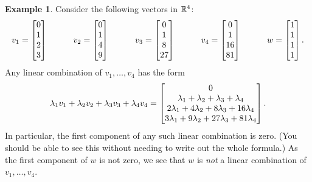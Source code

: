 \documentclass[reqno]{amsart}
\theoremstyle{definition}
\newtheorem{example}[theorem]{Example}
\begin{document}
\begin{example}\label{eg-lincomb-ii}
 Consider the following vectors in ${\mathbb{R}}^4$:
 \[ v_1 = \left[\begin{matrix} 0 \\ 1 \\  2 \\  3 \end{matrix}\right] \hspace{3em}
    v_2 = \left[\begin{matrix} 0 \\ 1 \\  4 \\  9 \end{matrix}\right] \hspace{3em}
    v_3 = \left[\begin{matrix} 0 \\ 1 \\  8 \\ 27 \end{matrix}\right] \hspace{3em}
    v_4 = \left[\begin{matrix} 0 \\ 1 \\ 16 \\ 81 \end{matrix}\right] \hspace{3em}
    w = \left[\begin{matrix} 1 \\ 1 \\ 1 \\ 1 \end{matrix}\right].
 \]
 Any linear combination of $v_1,\dotsc,v_4$ has the form
 \[ \lambda_1v_1 + \lambda_2v_2 + \lambda_3v_3 + \lambda_4v_4 =
     \left[\begin{matrix} 0 \\ \lambda_1+\lambda_2+\lambda_3+\lambda_4 \\
          2\lambda_1+4\lambda_2+8\lambda_3+16\lambda_4 \\
          3\lambda_1+9\lambda_2+27\lambda_3+81\lambda_4 \end{matrix}\right].
 \]
 In particular, the first component of any such linear combination is
 zero.  (You should be able to see this without needing to write out
 the whole formula.)  As the first component of $w$ is not zero, we
 see that $w$ is \emph{not} a linear combination of $v_1,\dotsc,v_4$.
\end{example}
\end{document}

